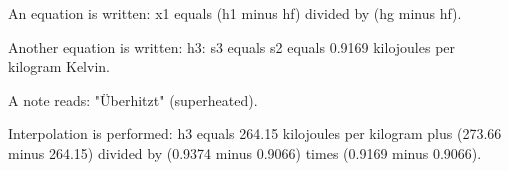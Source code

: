 An equation is written:  
x1 equals (h1 minus hf) divided by (hg minus hf).  

Another equation is written:  
h3: s3 equals s2 equals 0.9169 kilojoules per kilogram Kelvin.  

A note reads: "Überhitzt" (superheated).  

Interpolation is performed:  
h3 equals 264.15 kilojoules per kilogram plus (273.66 minus 264.15) divided by (0.9374 minus 0.9066) times (0.9169 minus 0.9066).